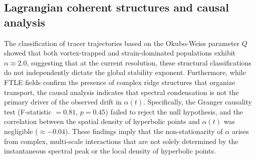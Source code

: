 \documentclass[]{article}
\begin{document}
\subsection{Lagrangian coherent structures and causal analysis}
The classification of tracer trajectories based on the Okubo-Weiss parameter $Q$ showed that both vortex-trapped and strain-dominated populations exhibit $\alpha \approx 2.0$, suggesting that at the current resolution, these structural classifications do not independently dictate the global stability exponent. Furthermore, while FTLE fields confirm the presence of complex ridge structures that organize transport, the causal analysis indicates that spectral condensation is not the primary driver of the observed drift in $\alpha(t)$. Specifically, the Granger causality test (F-statistic $= 0.81$, $p = 0.45$) failed to reject the null hypothesis, and the correlation between the spatial density of hyperbolic points and $\alpha(t)$ was negligible ($\approx -0.04$). These findings imply that the non-stationarity of $\alpha$ arises from complex, multi-scale interactions that are not solely determined by the instantaneous spectral peak or the local density of hyperbolic points.
\end{document}
